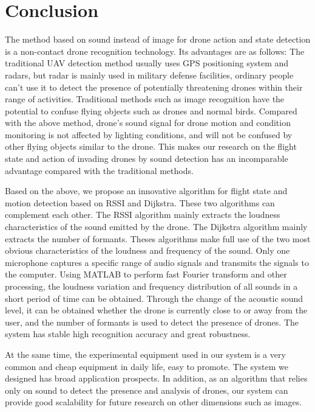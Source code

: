\documentclass{sig-alternate-10pt}
\begin{document}
\section{Conclusion}

The method based on sound instead of image for drone action and state detection is a non-contact drone recognition technology. Its advantages are as follows: The traditional UAV detection method usually uses GPS positioning system and radars, but radar is mainly used in military defense facilities, ordinary people can’t use it to detect the presence of potentially threatening drones within their range of activities. Traditional methods such as image recognition have the potential to confuse flying objects such as drones and normal birds. Compared with the above method, drone's sound signal for drone motion and condition monitoring is not affected by lighting conditions, and will not be confused by other flying objects similar to the drone. This makes our research on the flight state and action of invading drones by sound detection has an incomparable advantage compared with the traditional methods.

Based on the above, we propose an innovative algorithm for flight state and motion detection based on RSSI and Dijkstra. These two algorithms can complement each other. The RSSI algorithm mainly extracts the loudness characteristics of the sound emitted by the drone. The Dijkstra algorithm mainly extracts the number of formants. Theses algorithms make full use of the two most obvious characteristics of the loudness and frequency of the sound. Only one microphone captures a specific range of audio signals and transmits the signals to the computer. Using MATLAB to perform fast Fourier transform and other processing, the loudness variation and frequency distribution of all sounds in a short period of time can be obtained. Through the change of the acoustic sound level, it can be obtained whether the drone is currently close to or away from the user, and the number of formants is used to detect the presence of drones. The system has stable high recognition accuracy and great robustness.

At the same time, the experimental equipment used in our system is a very common and cheap equipment in daily life, easy to promote. The system we designed has broad application prospects. In addition, as an algorithm that relies only on sound to detect the presence and analysis of drones, our system can provide good scalability for future research on other dimensions such as images.



  
\end{document}
